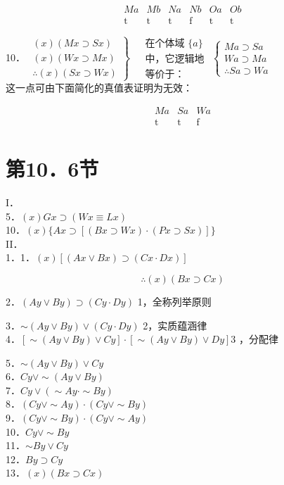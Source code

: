 $$
\begin{array}{cccccc}
M a & M b & N a & N b & O a & O b \\
\hline \mathrm{t} & \mathrm{t} & \mathrm{t} & \mathrm{f} & \mathrm{t} & \mathrm{t}
\end{array}
$$

10． $\left.\begin{array}{l}(x)(M x \supset S x) \\ (x)(W x \supset M x) \\ \therefore(x)(S x \supset W x)\end{array}\right\} \begin{aligned} & \text { 在个体域 }\{a\} \\ & \text { 中，它逻辑地 } \\ & \text { 等价于：}\end{aligned}\left\{\begin{array}{l}M a \supset S a \\ W a \supset M a \\ \therefore S a \supset W a\end{array}\right.$\\
这一点可由下面简化的真值表证明为无效：

$$
\begin{array}{ccc}
M a & S a & W a \\
\hline \mathrm{t} & \mathrm{t} & \mathrm{f}
\end{array}
$$

\section*{第10．6节}
I．\\
5．$(x) G x \supset(W x \equiv L x)$\\
10．$(x)\{A x \supset[(B x \supset W x) \cdot(P x \supset S x)]\}$\\
II．\\
1．1．$(x)[(A x \vee B x) \supset(C x \cdot D x)]$

$$
\therefore(x)(B x \supset C x)
$$

2．$(A y \vee B y) \supset(C y \cdot D y)$ 1，全称列举原则

3．$\sim(A y \vee B y) \vee(C y \cdot D y)$ 2，实质蕴涵律\\
4．$[\sim(A y \vee B y) \vee C y] \cdot[\sim(A y \vee B y) \vee D y] 3$ ，分配律

5．$\sim(A y \vee B y) \vee C y$\\
6．$C y \vee \sim(A y \vee B y)$\\
7．$C y \vee(\sim A y \cdot \sim B y)$\\
8．$(C y \vee \sim A y) \cdot(C y \vee \sim B y)$\\
9．$(C y \vee \sim B y) \cdot(C y \vee \sim A y)$\\
10．$C y \vee \sim B y$\\
11．$\sim B y \vee C y$\\
12．$B y \supset C y$\\
13．$(x)(B x \supset C x)$

